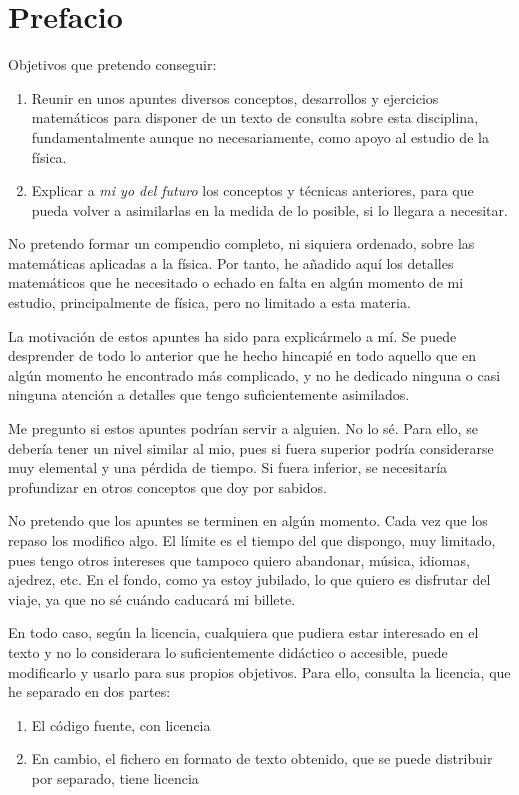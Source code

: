 %

\chapter{Prefacio}
Objetivos que pretendo conseguir:
\begin{enumerate}
\item Reunir en unos apuntes diversos conceptos, desarrollos y ejercicios matemáticos
  para disponer de un texto de consulta sobre esta disciplina, fundamentalmente aunque
  no necesariamente, como apoyo al estudio de la física.
\item Explicar a \emph{mi yo del futuro} los conceptos y técnicas anteriores, para que
  pueda volver a asimilarlas en la medida de lo posible, si lo llegara a necesitar.
\end{enumerate}

No pretendo formar un compendio completo, ni siquiera ordenado, sobre las matemáticas
aplicadas a la física.
Por tanto, he añadido aquí los detalles matemáticos que he necesitado o echado en falta
en algún momento de mi estudio, principalmente de física, pero no limitado a esta
materia.

La motivación de estos apuntes ha sido para explicármelo a mí.
Se puede desprender de todo lo anterior que he hecho hincapié en todo aquello que en
algún momento he encontrado más complicado, y no he dedicado ninguna o casi ninguna
atención a detalles que tengo suficientemente asimilados.

Me pregunto si estos apuntes podrían servir a alguien. No lo sé. Para ello, se debería
tener un nivel similar al mio, pues si fuera superior podría considerarse muy elemental
y una pérdida de tiempo. Si fuera inferior, se necesitaría profundizar en otros conceptos
que doy por sabidos.

No pretendo que los apuntes se terminen en algún momento. Cada vez que los repaso los
modifico algo. El límite es el tiempo del que dispongo, muy limitado, pues tengo otros
intereses que tampoco quiero abandonar, música, idiomas, ajedrez, etc.
En el fondo, como ya estoy jubilado, lo que quiero es disfrutar del viaje, ya que no sé
cuándo caducará mi billete.

En todo caso, según la licencia, cualquiera que pudiera estar interesado en el texto y no
lo considerara lo suficientemente didáctico o accesible, puede modificarlo y usarlo para
sus propios objetivos. Para ello, consulta la licencia, que he separado en dos partes:
\begin{enumerate}
\item El código fuente, con licencia
\item En cambio, el fichero en formato de texto obtenido, que se puede distribuir por
  separado, tiene licencia
\end{enumerate}

 
